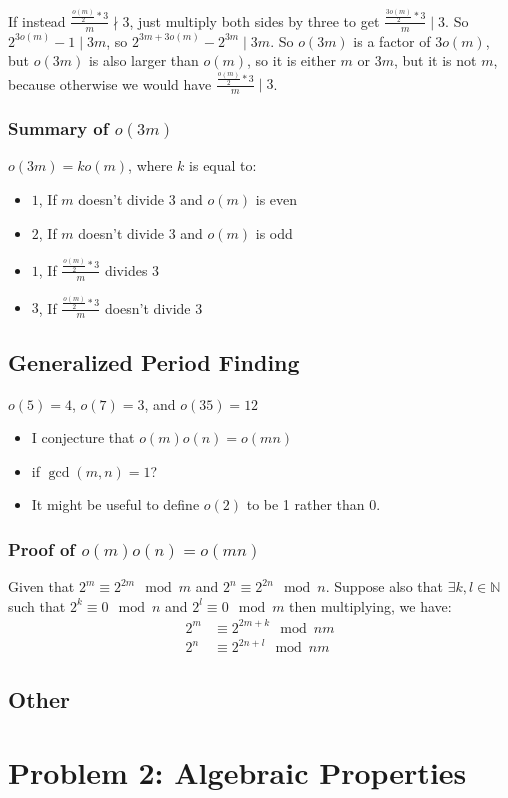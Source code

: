 \documentclass{article}
\begin{document}
  If instead $\frac{\frac{o(m)}{2} * 3}{m} \nmid 3$, just multiply both sides by three to get $\frac{\frac{3o(m)}{2} * 3}{m} \mid 3$. So $2^{3o(m)} - 1 \mid 3m$, so $2^{3m+3o(m)} - 2^{3m} \mid 3m$. So $o(3m)$ is a factor of $3o(m)$, but $o(3m)$ is also larger than $o(m)$, so it is either $m$ or $3m$, but it is not $m$, because otherwise we would have $\frac{\frac{o(m)}{2} * 3}{m} \mid 3$. 
  \subsubsection{Summary of $o(3m)$}
  $o(3m) = ko(m)$, where $k$ is equal to:
  \begin{itemize}
  \item $1$, If $m$ doesn't divide 3 and $o(m)$ is even
  \item $2$, If $m$ doesn't divide 3 and $o(m)$ is odd
  \item $1$, If $\frac{\frac{o(m)}{2} * 3}{m}$ divides 3
  \item $3$, If $\frac{\frac{o(m)}{2} * 3}{m}$ doesn't divide 3
  \end{itemize}
  \subsection{Generalized Period Finding}
  $o(5) = 4$, $o(7) = 3$, and $o(35) = 12$
  \begin{itemize}
  \item I conjecture that $o(m)o(n) = o(mn)$
  \item if $\gcd(m, n) = 1$?
  \item It might be useful to define $o(2)$ to be 1 rather than 0.
  \end{itemize}
  \subsubsection{Proof of $o(m)o(n) = o(mn)$}
  Given that $2^m \equiv 2^{2m} \mod m$ and $2^n \equiv 2^{2n} \mod n$. Suppose also that $\exists k, l \in \mathbb{N}$ such that $2^k \equiv 0 \mod n$ and $2^l \equiv 0 \mod m$ then multiplying, we have:
  \begin{align}
    2^m &\equiv 2^{2m+k} \mod nm \\
    2^n &\equiv 2^{2n+l} \mod nm 
  \end{align}
  \subsection{Other }
  \section{Problem 2: Algebraic Properties}
\end{document}
